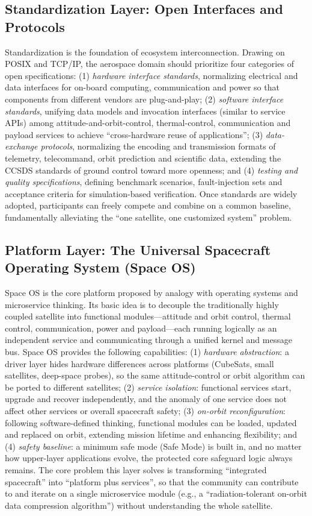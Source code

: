 \documentclass[11pt]{article}
\begin{document}
\subsection{Standardization Layer: Open Interfaces and Protocols}
Standardization is the foundation of ecosystem interconnection. Drawing on POSIX and TCP/IP, the aerospace domain should prioritize four categories of open specifications: (1) \emph{hardware interface standards}, normalizing electrical and data interfaces for on-board computing, communication and power so that components from different vendors are plug-and-play; (2) \emph{software interface standards}, unifying data models and invocation interfaces (similar to service APIs) among attitude-and-orbit-control, thermal-control, communication and payload services to achieve ``cross-hardware reuse of applications''; (3) \emph{data-exchange protocols}, normalizing the encoding and transmission formats of telemetry, telecommand, orbit prediction and scientific data, extending the CCSDS standards of ground control toward more openness; and (4) \emph{testing and quality specifications}, defining benchmark scenarios, fault-injection sets and acceptance criteria for simulation-based verification. Once standards are widely adopted, participants can freely compete and combine on a common baseline, fundamentally alleviating the ``one satellite, one customized system'' problem.

\subsection{Platform Layer: The Universal Spacecraft Operating System (Space OS)}
Space OS is the core platform proposed by analogy with operating systems and microservice thinking. Its basic idea is to decouple the traditionally highly coupled satellite into functional modules---attitude and orbit control, thermal control, communication, power and payload---each running logically as an independent service and communicating through a unified kernel and message bus. Space OS provides the following capabilities: (1) \emph{hardware abstraction}: a driver layer hides hardware differences across platforms (CubeSats, small satellites, deep-space probes), so the same attitude-control or orbit algorithm can be ported to different satellites; (2) \emph{service isolation}: functional services start, upgrade and recover independently, and the anomaly of one service does not affect other services or overall spacecraft safety; (3) \emph{on-orbit reconfiguration}: following software-defined thinking, functional modules can be loaded, updated and replaced on orbit, extending mission lifetime and enhancing flexibility; and (4) \emph{safety baseline}: a minimum safe mode (Safe Mode) is built in, and no matter how upper-layer applications evolve, the protected core safeguard logic always remains. The core problem this layer solves is transforming ``integrated spacecraft'' into ``platform plus services'', so that the community can contribute to and iterate on a single microservice module (e.g., a ``radiation-tolerant on-orbit data compression algorithm'') without understanding the whole satellite.
\end{document}
